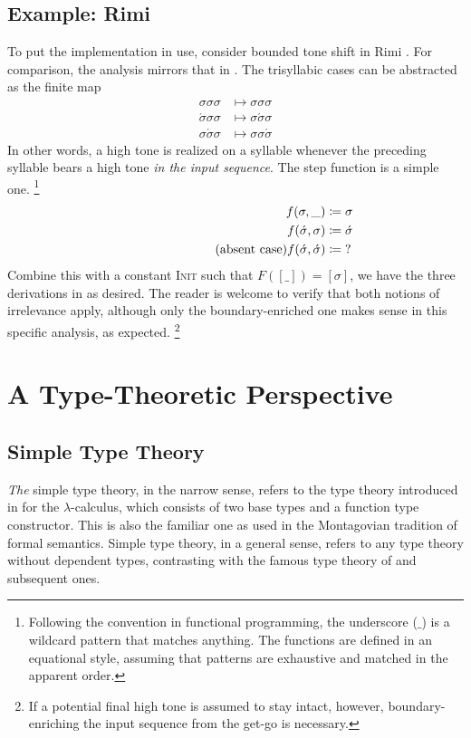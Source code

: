 \documentclass[11pt]{article}
\theoremstyle{definition}
\theoremstyle{plain}
\newcommand{\coloneq}{\mathrel{\vcentcolon\mkern-1.2mu=}}
\newcommand{\hole}{\_}
\newcommand{\comment}[1]{\text{\phantom{(#1)}} \tag{#1}}
\begin{document}
\subsection{Example: Rimi}
\label{sec:rimi}
To put the implementation in use, consider bounded tone shift in Rimi
\citep{m97oeot}.  For comparison, the analysis mirrors that in
\citet{cj21iolr}.  The trisyllabic cases can be abstracted as the
finite map
%
\begin{align*}
  \sigma\sigma\sigma &\mapsto \sigma\sigma\sigma \\
  \acute{\sigma}\sigma\sigma &\mapsto \sigma\acute{\sigma}\sigma \\
  \sigma\acute{\sigma}\sigma &\mapsto \sigma\sigma\acute{\sigma}
\end{align*}
%
In other words, a high tone is realized on a syllable whenever the
preceding syllable bears a high tone \emph{in the input sequence}.
The step function is a simple one.%
\footnote{Following the convention in functional programming, the
  underscore (\(\hole\)) is a wildcard pattern that matches anything.
  The functions are defined in an equational style, assuming that
  patterns are exhaustive and matched in the apparent order.}
%
\begin{align*}
  f(\sigma, \hole) &\coloneq \sigma \\
  f(\acute{\sigma}, \sigma) &\coloneq \acute{\sigma} \\
  \comment{absent case}
  f(\acute{\sigma}, \acute{\sigma}) &\coloneq {?}
\end{align*}
%
Combine this with a constant \textsc{Init} such that
\(F([\hole]) = [\sigma]\), we have the three derivations in
 as desired.  The reader is welcome to verify
that both notions of irrelevance apply, although only the
boundary-enriched one makes sense in this specific analysis, as
expected.%
\footnote{If a potential final high tone is assumed to stay intact,
  however, boundary-enriching the input sequence from the get-go is
  necessary.}

\section{A Type-Theoretic Perspective}
\subsection{Simple Type Theory}
\emph{The} simple type theory, in the narrow sense, refers to the type
theory introduced in \citet{c40fstt} for the \(\lambda\)-calculus,
which consists of two base types and a function type constructor.
This is also the familiar one as used in the Montagovian tradition of
formal semantics.  Simple type theory, in a general sense, refers to
any type theory without dependent types, contrasting with the famous
type theory of \citet{m75ittpp} and subsequent ones.
\end{document}
